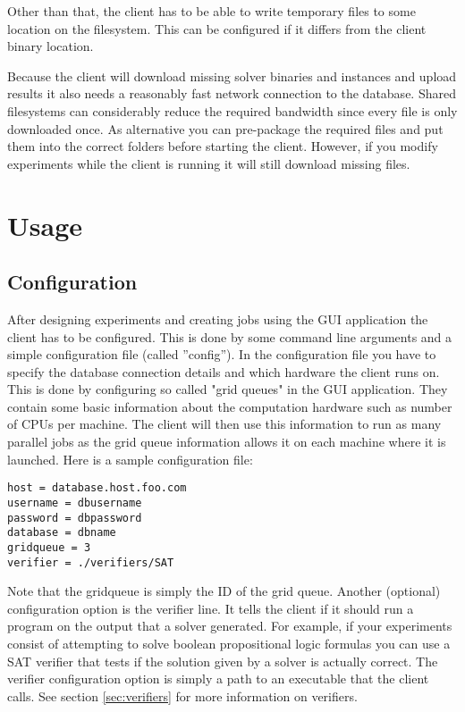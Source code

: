 \documentclass{article}
\begin{document}
Other than that, the client has to be able to write temporary files to some location on the filesystem. This can be configured if it differs from the client binary location.

Because the client will download missing solver binaries and instances and upload results it also needs a reasonably fast network connection to the database. Shared filesystems
can considerably reduce the required bandwidth since every file is only downloaded once. As alternative you can pre-package the required files and put them into the correct folders
before starting the client. However, if you modify experiments while the client is running it will still download missing files.

\newpage
\section{Usage}
\subsection{Configuration}
After designing experiments and creating jobs using the GUI application the client has to be configured. This is done by some command line arguments and a simple configuration file (called ''config'').
In the configuration file you have to specify the database connection details and which hardware the client runs on. This is done by configuring so called "grid queues" in the GUI application.
They contain some basic information about the computation hardware such as number of CPUs per machine. The client will then use this information to run as many parallel jobs as
the grid queue information allows it on each machine where it is launched. Here is a sample configuration file:
\begin{verbatim}
host = database.host.foo.com
username = dbusername
password = dbpassword
database = dbname
gridqueue = 3
verifier = ./verifiers/SAT
\end{verbatim}
Note that the gridqueue is simply the ID of the grid queue. Another (optional) configuration option is the verifier line. It tells the client if it should run a program on the output that a
solver generated. For example, if your experiments consist of attempting to solve boolean propositional logic formulas you can use a SAT verifier that tests if the solution given by a solver
is actually correct. The verifier configuration option is simply a path to an executable that the client calls. See section \ref{sec:verifiers} for more information on verifiers.
\end{document}
